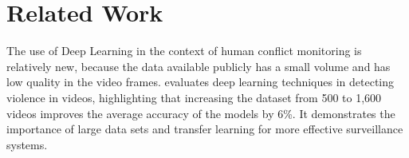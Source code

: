 \section{Related Work}



The use of Deep Learning in the context of human conflict monitoring is relatively new, because the data available publicly has a small volume and has low quality in the video frames.
\cite{Dashdamirov2024} evaluates deep learning techniques in detecting violence in videos, highlighting that increasing the dataset from 500 to 1,600 videos improves the average accuracy of the models by 6\%. It demonstrates the importance of large data sets and transfer learning for more effective surveillance systems.

